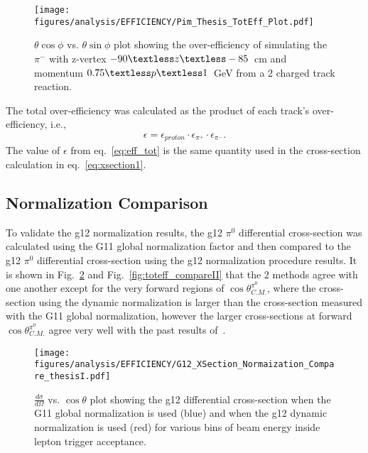 \begin{figure}[h!]\begin{center}
\texttt{[image: \\figures/analysis/EFFICIENCY/Pim\_Thesis\_TotEff\_Plot.pdf]}
\caption[$\theta \cos\phi$ vs. $\theta \sin\phi$ plot showing the over-efficiency of simulating the $\pi^-$ with z-vertex $-90\textless z\textless-85$~cm and momentum $0.75\textless p \textless 1$~GeV from a 2 charged track reaction]{\label{fig:toteff_pim} $\theta \cos\phi$ vs. $\theta \sin\phi$ plot showing the over-efficiency of simulating the $\pi^-$ with z-vertex $-90\textless z\textless-85$~cm and momentum $0.75\textless p \textless 1$~GeV from a 2 charged track reaction.}
\end{center}\end{figure}
%
The total over-efficiency was calculated as the product of each track's over-efficiency, i.e.,
\begin{align}\label{eq:eff_tot}
\epsilon = \epsilon_{proton}\cdot\epsilon_{\pi^+}\cdot\epsilon_{\pi^-}.
\end{align}
The value of $\epsilon$ from eq.~\ref{eq:eff_tot} is the same quantity used in the cross-section calculation in eq.~\ref{eq:xsection1}.
\FloatBarrier
%
\subsection{Normalization Comparison}
To validate the g12 normalization results, the g12 $\pi^0$ differential cross-section was calculated using the G11 global normalization factor and then compared to the g12 $\pi^0$ differential cross-section using the g12 normalization procedure results. It is shown in Fig.~\ref{fig:toteff_compareI} and Fig.~\ref{fig:toteff_compareII} that the 2 methods agree with one another except for the very forward regions of $\cos\theta^{\pi^0}_{C.M.}$, where the cross-section using the dynamic normalization is larger than the cross-section measured with the G11 global normalization, however the larger cross-sections at forward $\cos\theta^{\pi^0}_{C.M.}$ agree very well with the past results of~\cite{ELSA11}.

\begin{figure}[h!]\begin{center}
\texttt{[image: \\figures/analysis/EFFICIENCY/G12\_XSection\_Normaization\_Compare\_thesisI.pdf]}
\caption[$\frac{d \sigma}{d \Omega}$ vs. $\cos \theta$ plot showing the g12 \pizT differential cross-section when the G11 global normalization is used (blue) and when the g12 dynamic normalization is used (red) for various bins of beam energy inside lepton trigger acceptance]{\label{fig:toteff_compareI} $\frac{d \sigma}{d \Omega}$ vs. $\cos \theta$ plot showing the g12 \pizT differential cross-section when the G11 global normalization is used (blue) and when the g12 dynamic normalization is used (red) for various bins of beam energy inside lepton trigger acceptance.}
\end{center}\end{figure}

